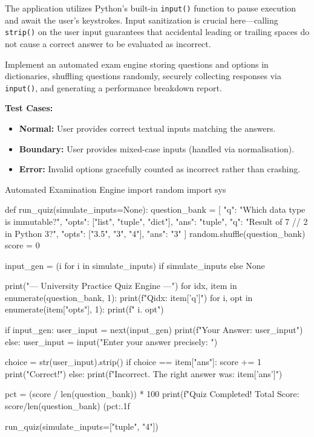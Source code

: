 The application utilizes Python's built-in \texttt{input()} function to pause execution and await the user's keystrokes. Input sanitization is crucial here—calling \texttt{strip()} on the user input guarantees that accidental leading or trailing spaces do not cause a correct answer to be evaluated as incorrect. 

\begin{practiceset}
Implement an automated exam engine storing questions and options in dictionaries, shuffling questions randomly, securely collecting responses via \texttt{input()}, and generating a performance breakdown report.

\textbf{Test Cases:}
\begin{itemize}
    \item \textbf{Normal:} User provides correct textual inputs matching the answers.
    \item \textbf{Boundary:} User provides mixed-case inputs (handled via normalisation).
    \item \textbf{Error:} Invalid options gracefully counted as incorrect rather than crashing.
\end{itemize}
\end{practiceset}

\begin{pythoncode}{Automated Examination Engine}
import random
import sys

def run_quiz(simulate_inputs=None):
    question_bank = [
        {"q": "Which data type is immutable?", "opts": ["list", "tuple", "dict"], "ans": "tuple"},
        {"q": "Result of 7 // 2 in Python 3?", "opts": ["3.5", "3", "4"], "ans": "3"}
    ]
    random.shuffle(question_bank)
    score = 0
    
    input_gen = (i for i in simulate_inputs) if simulate_inputs else None
    
    print("--- University Practice Quiz Engine ---\n")
    for idx, item in enumerate(question_bank, 1):
        print(f"Q{idx}: {item['q']}")
        for i, opt in enumerate(item["opts"], 1):
            print(f"   {i}. {opt}")
            
        if input_gen:
            user_input = next(input_gen)
            print(f"Your Answer: {user_input}")
        else:
            user_input = input("Enter your answer precisely: ")
            
        choice = str(user_input).strip()
        if choice == item["ans"]:
            score += 1
            print("Correct!\n")
        else:
            print(f"Incorrect. The right answer was: {item['ans']}\n")
            
    pct = (score / len(question_bank)) * 100
    print(f"Quiz Completed! Total Score: {score}/{len(question_bank)} ({pct:.1f}%

run_quiz(simulate_inputs=["tuple", "4"])
\end{pythoncode}

